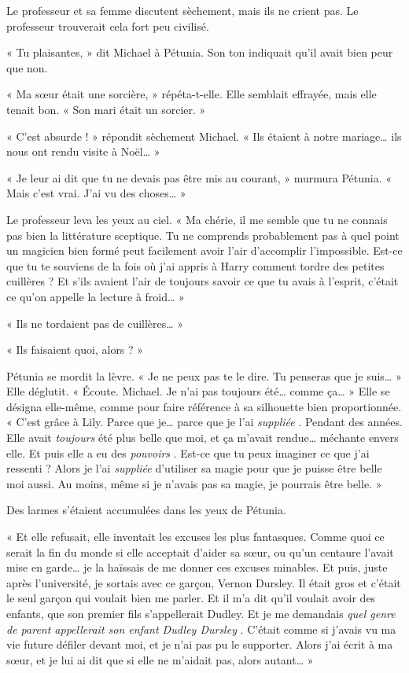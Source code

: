 Le professeur et sa femme discutent sèchement, mais ils ne crient pas. Le professeur trouverait cela fort peu civilisé.

« Tu plaisantes, » dit Michael à Pétunia. Son ton indiquait qu'il avait bien peur que non.

« Ma sœur était une sorcière, » répéta-t-elle. Elle semblait effrayée, mais elle tenait bon. « Son mari était un sorcier. »

« C'est absurde ! » répondit sèchement Michael. « Ils étaient à notre mariage… ils nous ont rendu visite à Noël… »

« Je leur ai dit que tu ne devais pas être mis au courant, » murmura Pétunia. « Mais c'est vrai. J'ai vu des choses… »

Le professeur leva les yeux au ciel. « Ma chérie, il me semble que tu ne connais pas bien la littérature sceptique. Tu ne comprends probablement pas à quel point un magicien bien formé peut facilement avoir l'air d'accomplir l'impossible. Est-ce que tu te souviens de la fois où j'ai appris à Harry comment tordre des petites cuillères ? Et s'ils avaient l'air de toujours savoir ce que tu avais à l'esprit, c'était ce qu'on appelle la lecture à froid… »

« Ils ne tordaient pas de cuillères… »

« Ils faisaient quoi, alors ? »

Pétunia se mordit la lèvre. « Je ne peux pas te le dire. Tu penseras que je suis… » Elle déglutit. « Écoute. Michael. Je n'ai pas toujours été… comme ça… » Elle se désigna elle-même, comme pour faire référence à sa silhouette bien proportionnée. « C'est grâce à Lily. Parce que je… parce que je l'ai \emph{suppliée} . Pendant des années. Elle avait \emph{toujours}  été plus belle que moi, et ça m'avait rendue… méchante envers elle. Et puis elle a eu des \emph{pouvoirs} . Est-ce que tu peux imaginer ce que j'ai ressenti ? Alors je l'ai \emph{suppliée}  d'utiliser sa magie pour que je puisse être belle moi aussi. Au moins, même si je n'avais pas sa magie, je pourrais être belle. »

Des larmes s'étaient accumulées dans les yeux de Pétunia.

« Et elle refusait, elle inventait les excuses les plus fantasques. Comme quoi ce serait la fin du monde si elle acceptait d'aider sa sœur, ou qu'un centaure l'avait mise en garde… je la haïssais de me donner ces excuses minables. Et puis, juste après l'université, je sortais avec ce garçon, Vernon Dursley. Il était gros et c'était le seul garçon qui voulait bien me parler. Et il m'a dit qu'il voulait avoir des enfants, que son premier fils s'appellerait Dudley. Et je me demandais \emph{quel genre de parent appellerait son enfant Dudley Dursley} . C'était comme si j'avais vu ma vie future défiler devant moi, et je n'ai pas pu le supporter. Alors j'ai écrit à ma sœur, et je lui ai dit que si elle ne m'aidait pas, alors autant… »

